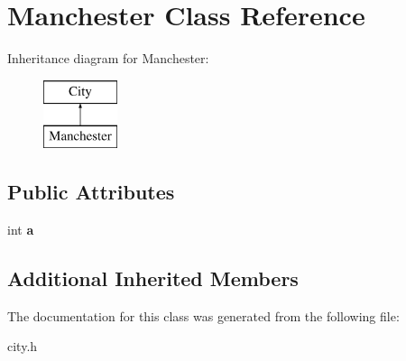 \hypertarget{class_manchester}{}\section{Manchester Class Reference}
\label{class_manchester}
Inheritance diagram for Manchester\+:\begin{figure}[H]
\begin{center}
\leavevmode
\includegraphics[height=2.000000cm]{class_manchester}
\end{center}
\end{figure}
\subsection*{Public Attributes}
\begin{DoxyCompactItemize}
\item 
\hypertarget{class_manchester_adfeb7df12606d971fd5cab78d9a8e4a0}{}int {\bfseries a}\label{class_manchester_adfeb7df12606d971fd5cab78d9a8e4a0}

\end{DoxyCompactItemize}
\subsection*{Additional Inherited Members}


The documentation for this class was generated from the following file\+:\begin{DoxyCompactItemize}
\item 
city.\+h\end{DoxyCompactItemize}
